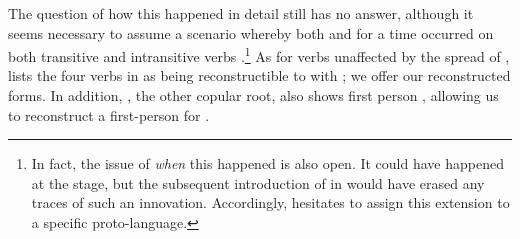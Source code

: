 %
%
The question of how this happened in detail \parencite[107--112]{meira1998proto} still has no answer, although it seems necessary to assume a scenario whereby both  and  for a time occurred on both transitive and intransitive verbs \parencite[112]{meira1998proto}.\footnote{In fact, the issue of \emph{when} this happened is also open. It could have happened at the \PTar stage, but the subsequent introduction of  in \carijo {} would have erased any traces of such an innovation. Accordingly, \textcite{meira1998proto} hesitates to assign this extension to a specific proto-language.}
As for verbs unaffected by the spread of , \textcite{meira1998proto} lists the four verbs in  as being reconstructible to \PTar with ; we offer our reconstructed \PTir forms.
In addition, \trio {} , the other copular root, also shows first person  \parencite[294]{triomeira1999}, allowing us to reconstruct a first-person  for \PTir.

